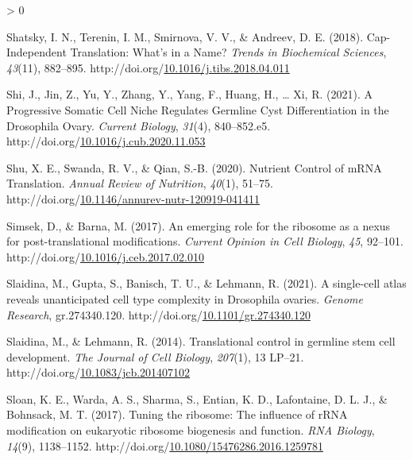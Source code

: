 \documentclass[12pt,oneside]{reedthesis}
\newlength{\cslhangindent}
\newenvironment{CSLReferences}[2] %
 {%
  \setlength{\parindent}{0pt}
  \ifodd #1 \everypar{\setlength{\hangindent}{\cslhangindent}}\ignorespaces\fi
  \ifnum #2 > 0
  \setlength{\parskip}{#2\baselineskip}
  \fi
 }%
 {}
\begin{document}
\begin{CSLReferences}{1}{0}
\leavevmode\hypertarget{ref-shatskyCapIndependentTranslationWhat2018}{}%
Shatsky, I. N., Terenin, I. M., Smirnova, V. V., \& Andreev, D. E. (2018). Cap-{Independent Translation}: {What}'s in a {Name}? \emph{Trends in Biochemical Sciences}, \emph{43}(11), 882--895. http://doi.org/\href{https://doi.org/10.1016/j.tibs.2018.04.011}{10.1016/j.tibs.2018.04.011}

\leavevmode\hypertarget{ref-shiProgressiveSomaticCell2021}{}%
Shi, J., Jin, Z., Yu, Y., Zhang, Y., Yang, F., Huang, H., \ldots{} Xi, R. (2021). A {Progressive Somatic Cell Niche Regulates Germline Cyst Differentiation} in the {Drosophila Ovary}. \emph{Current Biology}, \emph{31}(4), 840--852.e5. http://doi.org/\href{https://doi.org/10.1016/j.cub.2020.11.053}{10.1016/j.cub.2020.11.053}

\leavevmode\hypertarget{ref-shuNutrientControlMRNA2020}{}%
Shu, X. E., Swanda, R. V., \& Qian, S.-B. (2020). Nutrient {Control} of {mRNA Translation}. \emph{Annual Review of Nutrition}, \emph{40}(1), 51--75. http://doi.org/\href{https://doi.org/10.1146/annurev-nutr-120919-041411}{10.1146/annurev-nutr-120919-041411}

\leavevmode\hypertarget{ref-simsekEmergingRoleRibosome2017}{}%
Simsek, D., \& Barna, M. (2017). An emerging role for the ribosome as a nexus for post-translational modifications. \emph{Current Opinion in Cell Biology}, \emph{45}, 92--101. http://doi.org/\href{https://doi.org/10.1016/j.ceb.2017.02.010}{10.1016/j.ceb.2017.02.010}

\leavevmode\hypertarget{ref-slaidinaSinglecellAtlasReveals2021}{}%
Slaidina, M., Gupta, S., Banisch, T. U., \& Lehmann, R. (2021). A single-cell atlas reveals unanticipated cell type complexity in {Drosophila} ovaries. \emph{Genome Research}, gr.274340.120. http://doi.org/\href{https://doi.org/10.1101/gr.274340.120}{10.1101/gr.274340.120}

\leavevmode\hypertarget{ref-Slaidina2014h}{}%
Slaidina, M., \& Lehmann, R. (2014). Translational control in germline stem cell development. \emph{The Journal of Cell Biology}, \emph{207}(1), 13 LP--21. http://doi.org/\href{https://doi.org/10.1083/jcb.201407102}{10.1083/jcb.201407102}

\leavevmode\hypertarget{ref-Sloan2017e}{}%
Sloan, K. E., Warda, A. S., Sharma, S., Entian, K. D., Lafontaine, D. L. J., \& Bohnsack, M. T. (2017). Tuning the ribosome: {The} influence of {rRNA} modification on eukaryotic ribosome biogenesis and function. \emph{RNA Biology}, \emph{14}(9), 1138--1152. http://doi.org/\href{https://doi.org/10.1080/15476286.2016.1259781}{10.1080/15476286.2016.1259781}


\end{CSLReferences}
\end{document}
